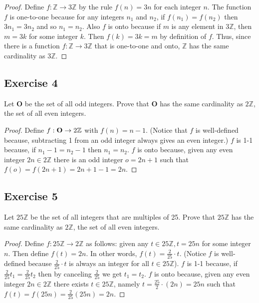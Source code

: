 \documentclass[14pt]{extarticle}
\newcommand{\Z}{\mathbb{Z}}
\begin{document}
\begin{proof}
    Define \(f: \Z \to 3\Z\) by the rule \(f(n) = 3n\) for each integer $n$. The function $f$ is one-to-one because for any
    integers $n_1$ and $n_2$, if \(f(n_1) = f(n_2)\) then \(3n_1 = 3n_2\) and so \(n_1 = n_2\). Also $f$ is onto
    because if $m$ is any element in $3\Z$, then \(m = 3k\) for some integer $k$. Then \(f(k) = 3k = m\) by definition of
    $f$. Thus, since there is a function \(f: \Z \to 3\Z\) that is one-to-one and onto, $\Z$ has the same cardinality as $3\Z$.
\end{proof}

\subsection{Exercise 4}
Let {\bf O} be the set of all odd integers. Prove that {\bf O} has the same cardinality as $2\Z$, the set of all even
integers.

\begin{proof}
    Define \(f: {\bf O} \to 2\Z\) with \(f(n) = n-1\). (Notice that $f$ is well-defined because, subtracting 1 from an odd
    integer always gives an even integer.) $f$ is 1-1 because, if \(n_1 - 1 = n_2 - 1\) then \(n_1 = n_2\). $f$ is onto
    because, given any even integer \(2n \in 2\Z\) there is an odd integer \(o = 2n+1\) such that
    \(f(o) = f(2n+1) = 2n+1-1 = 2n\).
\end{proof}

\subsection{Exercise 5}
Let $25\Z$ be the set of all integers that are multiples of 25. Prove that $25\Z$ has the same cardinality as $2\Z$,
the set of all even integers.

\begin{proof}
    Define \(f: 25\Z \to 2\Z\) as follows: given any \(t \in 25\Z, t = 25n\) for some integer $n$. Then define \(f(t) =
    2n\). In other words, \(f(t) = \frac{2}{25} \cdot t\). (Notice $f$ is well-defined because \(\frac{2}{25} \cdot
    t\) is always an integer for all \(t \in 25\Z\)). $f$ is 1-1 because, if \(\frac{2}{25}t_1 = \frac{2}{25}t_2\) then
    by canceling $\frac{2}{25}$ we get \(t_1 = t_2\). $f$ is onto because, given any even integer \(2n \in 2\Z\) there
    exists \(t \in 25\Z\), namely \(t = \frac{25}{2} \cdot (2n) = 25n\) such that \(f(t) = f(25n) = \frac{2}{25}(25n) = 2n\).
\end{proof}
\end{document}
